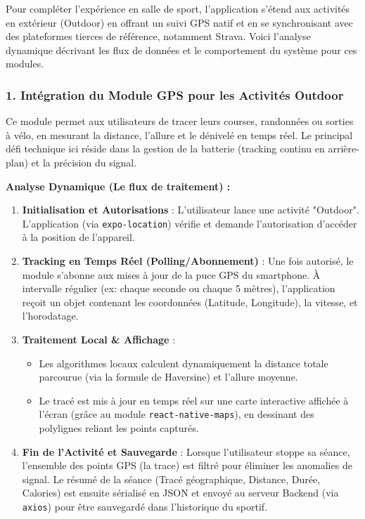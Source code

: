 Pour compléter l'expérience en salle de sport, l'application s'étend aux activités en extérieur (Outdoor) en offrant un suivi GPS natif et en se synchronisant avec des plateformes tierces de référence, notamment Strava.
Voici l'analyse dynamique décrivant les flux de données et le comportement du système pour ces modules.

\subsubsection{1. Intégration du Module GPS pour les Activités Outdoor}
Ce module permet aux utilisateurs de tracer leurs courses, randonnées ou sorties à vélo, en mesurant la distance, l'allure et le dénivelé en temps réel. Le principal défi technique ici réside dans la gestion de la batterie (tracking continu en arrière-plan) et la précision du signal.

\textbf{Analyse Dynamique (Le flux de traitement) :}
\begin{enumerate}
    \item \textbf{Initialisation et Autorisations} : L'utilisateur lance une activité "Outdoor". L'application (via \texttt{expo-location}) vérifie et demande l'autorisation d'accéder à la position de l'appareil.
    \item \textbf{Tracking en Temps Réel (Polling/Abonnement)} : Une fois autorisé, le module s'abonne aux mises à jour de la puce GPS du smartphone. À intervalle régulier (ex: chaque seconde ou chaque 5 mètres), l'application reçoit un objet contenant les coordonnées (Latitude, Longitude), la vitesse, et l'horodatage.
    \item \textbf{Traitement Local \& Affichage} :
    \begin{itemize}
        \item Les algorithmes locaux calculent dynamiquement la distance totale parcourue (via la formule de Haversine) et l'allure moyenne.
        \item Le tracé est mis à jour en temps réel sur une carte interactive affichée à l'écran (grâce au module \texttt{react-native-maps}), en dessinant des polylignes reliant les points capturés.
    \end{itemize}
    \item \textbf{Fin de l'Activité et Sauvegarde} : Lorsque l'utilisateur stoppe sa séance, l'ensemble des points GPS (la trace) est filtré pour éliminer les anomalies de signal. Le résumé de la séance (Tracé géographique, Distance, Durée, Calories) est ensuite sérialisé en JSON et envoyé au serveur Backend (via \texttt{axios}) pour être sauvegardé dans l'historique du sportif.
\end{enumerate}

